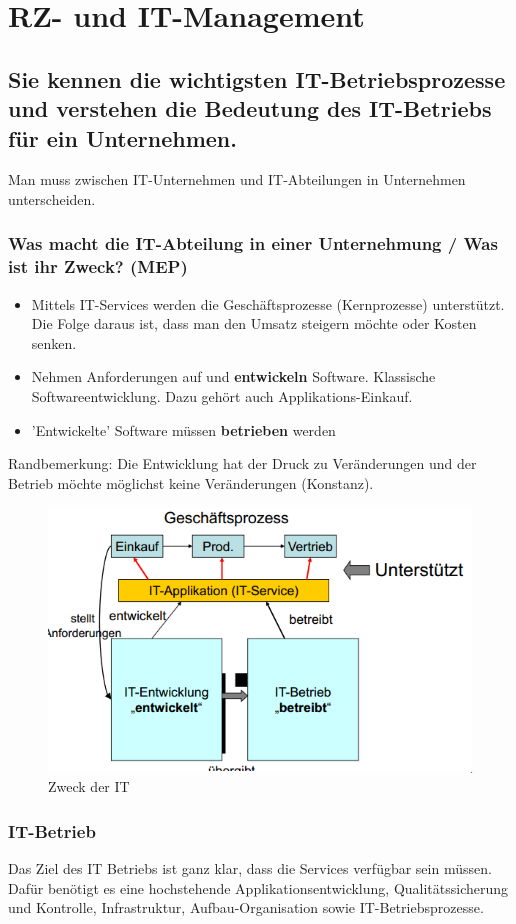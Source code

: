 \chapter{RZ- und IT-Management}

\section{Sie kennen die wichtigsten IT-Betriebsprozesse und	verstehen die Bedeutung des IT-Betriebs für ein	Unternehmen.}

Man muss zwischen IT-Unternehmen und IT-Abteilungen in Unternehmen unterscheiden.

\subsection{Was macht die IT-Abteilung in einer Unternehmung / Was ist ihr Zweck? (MEP)}
\begin{itemize}
	\item Mittels IT-Services werden die Geschäftsprozesse (Kernprozesse) unterstützt. Die Folge daraus ist, dass man den Umsatz steigern möchte oder Kosten senken.
	\item Nehmen Anforderungen auf und \textbf{entwickeln} Software. Klassische Softwareentwicklung. Dazu gehört auch Applikations-Einkauf.
	\item 'Entwickelte' Software müssen \textbf{betrieben} werden
\end{itemize}
Randbemerkung: Die Entwicklung hat der Druck zu Veränderungen und der Betrieb möchte möglichst keine Veränderungen (Konstanz).

\begin{figure}[h]
	\centering
	\includegraphics[width=0.7\linewidth]{fig/zweck-der-it}
	\caption{Zweck der IT}
\end{figure}

\subsection{IT-Betrieb}
Das Ziel des IT Betriebs ist ganz klar, dass die Services verfügbar sein müssen. Dafür benötigt es eine hochstehende Applikationsentwicklung, Qualitätssicherung und Kontrolle, Infrastruktur, Aufbau-Organisation sowie IT-Betriebsprozesse.

